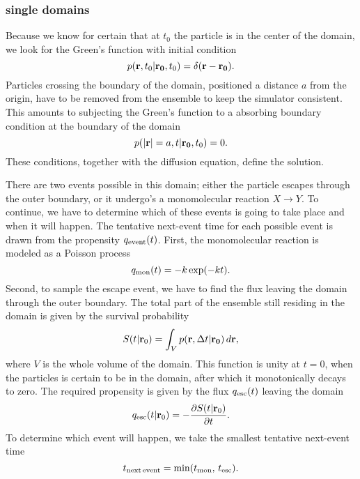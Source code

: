 \subsubsection{single domains}
Because we know for certain that at $t_0$ the particle is in the center of the domain, we look for the Green's function with initial condition
\begin{equation}
 p({\bf r}, t_0|{\bf r_0},t_0) = \delta(\mathbf{r - r_0}).
\end{equation}
Particles crossing the boundary of the domain, positioned a distance $a$ from the origin, have to be removed from the ensemble to keep the simulator consistent. This amounts to subjecting the Green's function to a absorbing boundary condition at the boundary of the domain
\begin{equation}
 p({\bf |r|}=a, t|{\bf r_0},t_0) = 0.
\end{equation}
These conditions, together with the diffusion equation, define the solution. \cite{Carslaw1959}\cite{Beck1992} 

There are two events possible in this domain; either the particle escapes through the outer boundary, or it undergo's a monomolecular reaction $X\rightarrow Y$. To continue, we have to determine which of these events is going to take place and when it will happen. The tentative next-event time for each possible event is drawn from the propensity $q_{\rm event}(t)$. First, the monomolecular reaction is modeled as a Poisson process
\begin{equation}
 q_{\rm mon}(t) = -k\, {\rm exp}(-k t).
\end{equation}
Second, to sample the escape event, we have to find the flux leaving the domain through the outer boundary. The total part of the ensemble still residing in the domain is given by the survival probability
\begin{equation}
 S(t|{\mathbf r_0}) = \int_V p({\bf r}, \Delta t|{\bf r_0}) \, d{\mathbf r},
 \elabel{Surv}
\end{equation}
where $V$ is the whole volume of the domain. This function is unity at $t=0$, when the particles is certain to be in the domain, after which it monotonically decays to zero. The required propensity is given by the flux $q_{\rm esc}(t)$ leaving the domain
\begin{equation}
 q_{\rm esc}(t|{\mathbf r_0}) = -\pdiff{S(t|{\mathbf r_0})}{t}.
 \elabel{Sflux}
\end{equation}
To determine which event will happen, we take the smallest tentative next-event time
\begin{equation}
 t_{\rm next\,event} = {\rm min}(t_{\rm mon},\,t_{\rm esc}).
\end{equation}

